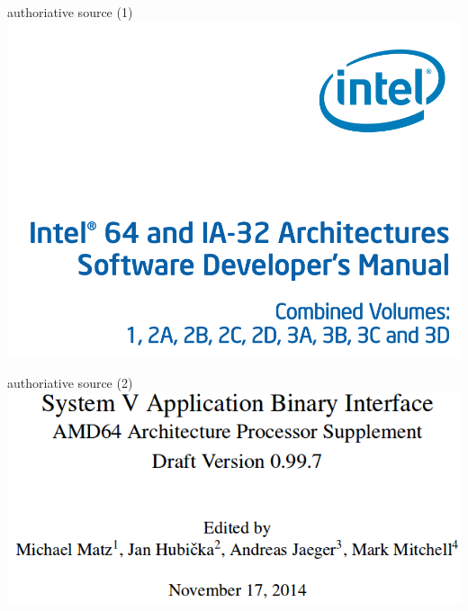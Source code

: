 \begin{frame}{authoriative source (1)}
    \includegraphics[height=.8\textheight]{../asm/manual-screenshot}
\end{frame}

\begin{frame}{authoriative source (2)}
    \includegraphics[height=.8\textheight]{../asm/abi-cover}
\end{frame}

